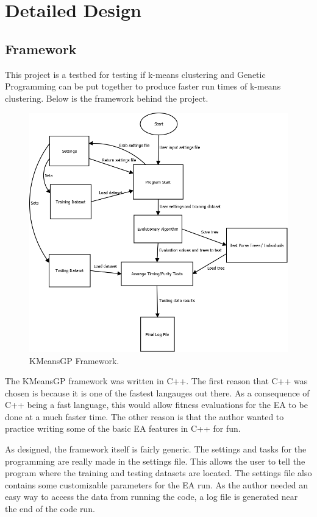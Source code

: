 \documentclass[conference]{IEEEtran}
\begin{document}
\section{Detailed Design}
\subsection{Framework}
This project is a testbed for testing if k-means clustering and Genetic Programming can be put together to produce faster run times of k-means clustering.  Below is the framework behind the project.

\begin{figure}[H]
\begin{center}
\includegraphics[width=0.8\columnwidth]{Architecture.png}
\caption{KMeansGP Framework.}
\end{center}
\label{fig}
\end{figure}

The KMeansGP framework was written in C++.  The first reason that C++ was chosen is because it is one of the fastest langauges out there\cite{Aruboa2014}.  As a consequence of C++ being a fast language, this would allow fitness evaluations for the EA to be done at a much faster time.  The other reason is that the author wanted to practice writing some of the basic EA features in C++ for fun.

As designed, the framework itself is fairly generic.  The settings and tasks for the programming are really made in the settings file.  This allows the user to tell the program where the training and testing datasets are located.  The settings file also contains some customizable parameters for the EA run.  As the author needed an easy way to access the data from running the code, a log file is generated near the end of the code run.
\end{document}
